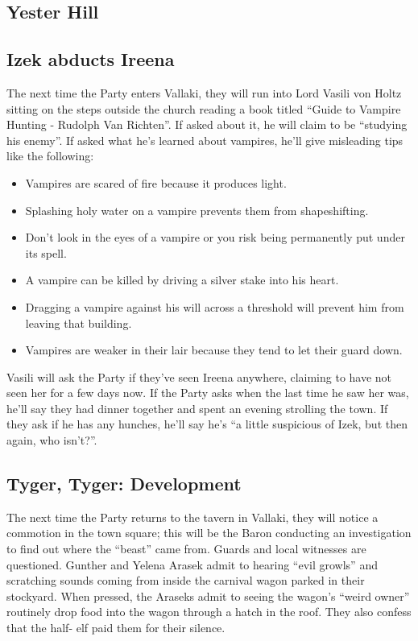 \documentclass[a4paper,11pt]{article}
\begin{document}
\subsection{Yester Hill}


\subsection{Izek abducts Ireena}
The next time the Party enters Vallaki, they will run into Lord Vasili von Holtz sitting on the steps outside the church reading a book titled ``Guide to Vampire Hunting - Rudolph Van Richten''. If asked about it, he will claim to be ``studying his enemy''. If asked what he's learned about vampires, he'll give misleading tips like the following:
\begin{itemize}
  \item Vampires are scared of fire because it produces light.
  \item Splashing holy water on a vampire prevents them from shapeshifting.
  \item Don't look in the eyes of a vampire or you risk being permanently put under its spell.
  \item A vampire can be killed by driving a silver stake into his heart.
  \item Dragging a vampire against his will across a threshold will prevent him from leaving that building.
  \item Vampires are weaker in their lair because they tend to let their guard down.
\end{itemize}
Vasili will ask the Party if they've seen Ireena anywhere, claiming to have not seen her for a few days now. If 
the Party asks when the last time he saw her was, he'll say they had dinner together and spent an evening 
strolling the town. If they ask if he has any hunches, he'll say he's ``a little suspicious of Izek, but then 
again, who isn't?''.

\subsection{Tyger, Tyger: Development}
The next time the Party returns to the tavern in Vallaki, they will notice a commotion in the town square; this 
will be the Baron conducting an investigation to find out where the ``beast'' came from. Guards and local 
witnesses are questioned. Gunther and Yelena Arasek admit to hearing ``evil growls'' and scratching sounds coming 
from inside the carnival wagon parked in their stockyard. When pressed, the Araseks admit to seeing the wagon's 
``weird owner'' routinely drop food into the wagon through a hatch in the roof. They also confess that the half-
elf paid them for their silence.
\end{document}
